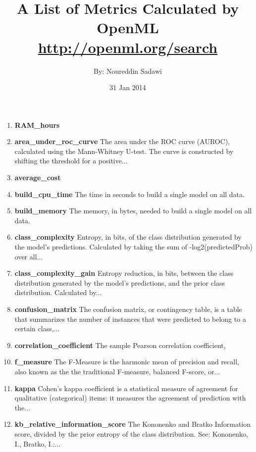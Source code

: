 \documentclass[a4paper,12pt, english]{article}
\begin{document}
\title{A List of Metrics Calculated by OpenML \\ \small{\url{http://openml.org/search}}}
\date{31 Jan 2014}
\author{By: Noureddin Sadawi}
\maketitle

\large

\begin{enumerate}


	
\item \textbf{RAM\_hours}
\item \textbf{area\_under\_roc\_curve}
The area under the ROC curve (AUROC), calculated using the Mann-Whitney U-test. The curve is constructed by shifting the threshold for a positive...
\item \textbf{average\_cost}
\item \textbf{build\_cpu\_time}
The time in seconds to build a single model on all data.
\item \textbf{build\_memory}
The memory, in bytes, needed to build a single model on all data.
\item \textbf{class\_complexity}
Entropy, in bits, of the class distribution generated by the model's predictions. Calculated by taking the sum of -log2(predictedProb) over all...
\item \textbf{class\_complexity\_gain}
Entropy reduction, in bits, between the class distribution generated by the model's predictions, and the prior class distribution. Calculated by...
\item \textbf{confusion\_matrix}
The confusion matrix, or contingency table, is a table that summarizes the number of instances that were predicted to belong to a certain class,...
\item \textbf{correlation\_coefficient}
The sample Pearson correlation coefficient, 
\item \textbf{f\_measure}
The F-Measure is the harmonic mean of precision and recall, also known as the the traditional F-measure, balanced F-score, or...
\item \textbf{kappa}
Cohen's kappa coefficient is a statistical measure of agreement for qualitative (categorical) items: it measures the agreement of prediction with the...
\item \textbf{kb\_relative\_information\_score}
The Kononenko and Bratko Information score, divided by the prior entropy of the class distribution. See: Kononenko, I., Bratko, I.:...

\end{enumerate}
\end{document}
